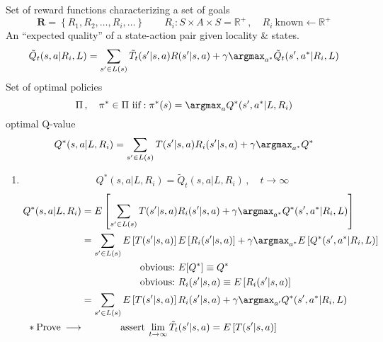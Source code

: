 \begin{enumerate}[label=1.0.\arabic*]
Set of reward functions characterizing a set of goals
\begin{equation}
\mathbf{R}=\left\{ R_1, R_2, \ldots, R_i, \ldots \right\}\qquad R_i: S \times A \times S  = \mathbb{R}^{+}\,, \quad R_i\:\text{known} \leftarrow \mathbb{R}^{+}
\end{equation}
An ``expected quality'' of a state-action pair given locality \& states.
\begin{equation}
\tilde{Q}_t( s, a | R_i, L ) = \sum_{s^\prime \in L( s )} \tilde{T}_t( s^\prime | s, a) R( s^\prime | s, a ) + \gamma \argmax_{a^{*}} \tilde{Q}_{t}( s^\prime, a^\ast | R_i, L )
\end{equation}
Set of optimal policies
\begin{equation}
\Pi\,,\quad \pi^{*} \in \Pi \text{\ iif}: \pi^{\ast}( s ) = \argmax_{a} Q^{\ast}( s^\prime, a^{\ast} | L, R_i )
\end{equation}
optimal Q-value
\begin{equation}
Q^{\ast}( s, a | L, R_i  ) = \sum_{s^\prime \in L( s )} T( s^{\prime} | s, a ) R_i( s^\prime | s, a ) + \gamma \argmax_{a^{\ast}} Q^{\ast}
\end{equation}
\begin{enumerate}[label=\arabic*.]
\item \begin{equation}
Q^{\ast}( s, a | L, R_i ) = \tilde{Q}_t( s, a | L, R_i )\,,\quad t \to \infty
\end{equation}
\begin{align}
Q^{\ast}( s, a | L, R_i ) & = E\left[ \sum_{s^{\prime} \in L( s )} T( s^{\prime} | s, a ) R_i( s^{\prime} | s, a ) + \gamma \argmax_{a^{\ast}} Q^{\ast}( s^{\prime}, a^{\ast} | R_i, L ) \right] \\
& = \sum_{s^{\prime} \in L( s )} E\left[ T( s^{\prime} | s, a ) \right] E\left[ R_i( s^{\prime} | s, a ) \right] + \gamma \argmax_{a^{\ast}} E\left[ Q^{\ast}( s^{\prime}, a^{\ast} | R_i, L ) \right] \\
& \qquad \qquad \qquad \text{obvious:\ }E[ Q^{\ast} ] \equiv Q^{\ast} \nonumber \\
& \qquad \qquad \qquad \text{obvious:\ }R_i( s^{\prime} | s, a ) \equiv E\left[ R_i( s^{\prime} | s, a ) \right] \nonumber \\
& = \sum_{s^{\prime} \in L(s)} E\left[ T( s^{\prime} | s, a ) \right] R_i( s^{\prime} | s, a ) + \gamma \argmax_{a^{\prime}} Q^{\ast}( s^{\prime}, a^{\ast} | R_i, L ) \\
\ast\:\text{Prove}\:\longrightarrow & \qquad \qquad \text{assert}\:\lim_{t \to \infty} \tilde{T}_t( s^{\prime} | s, a ) = E\left[ T( s^{\prime} | s, a ) \right] \nonumber \\

\end{align}
\end{enumerate}
\end{enumerate}
